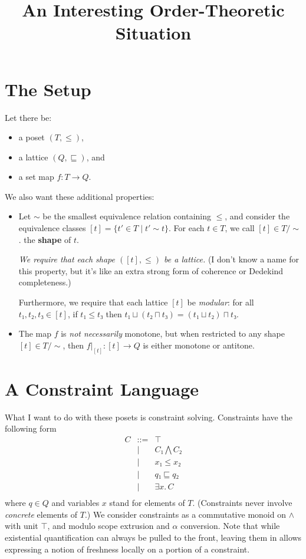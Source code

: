 \documentclass[11pt]{article}
\title{An Interesting Order-Theoretic Situation}
\def\conj{\wedge}
\begin{document}
\maketitle

\section*{The Setup}

Let there be:
\begin{itemize}
  \item a poset $(T, ≤)$,
  \item a lattice $(Q, ⊑)$, and
  \item a set map $f\colon T → Q$.
\end{itemize}

We also want these additional properties:
\begin{itemize}
\item

Let $\sim$ be the smallest equivalence relation containing $≤$, and
consider the equivalence classes $[t] = \{ t' ∈ T \mathrel\vert t' \sim
t \}$.  For each $t ∈ T$, we call $[t] ∈ T/{\sim}$.  the \textbf{shape}
of $t$.

\emph{We require that each shape $([t], ≤)$ be a lattice.}
(I don't know a name for this property, but it's like an extra strong
form of coherence or Dedekind completeness.)

Furthermore, we require that each lattice $[t]$ be \emph{modular}:
for all $t₁, t₂, t₃ ∈ [t]$,
if $t₁ ≤ t₃$ then $t₁ ⊔ (t₂ ⊓ t₃) = (t₁ ⊔ t₂) ⊓ t₃$.

\item 
  The map $f$ is \emph{not necessarily} monotone, but when
  restricted to any shape $[t] ∈ T/{\sim}$, then
  $f|_{[t]}\colon [t] → Q$ is either monotone or antitone.
\end{itemize}

\section*{A Constraint Language}

What I want to do with these posets is constraint solving. 
Constraints have the following form
\[
\begin{array}{rcl}
    C & \mathop{::=} & ⊤ \\
      & | & C₁ ⋀ C₂      \\
      & | & x₁ ≤ x₂      \\
      & | & q₁ ⊑ q₂      \\
      & | & ∃ x.\, C     \\
\end{array}
\]
where $q ∈ Q$ and
variables $x$ stand for elements of $T$.
(Constraints never involve \emph{concrete} elements of $T$.)
We consider constraints as a commutative monoid on $\conj$ with unit
$⊤$, and modulo scope extrusion and $α$ conversion.
Note that while existential quantification can always be pulled to the
front, leaving them in allows expressing a notion of freshness locally on
a portion of a constraint.
\end{document}
